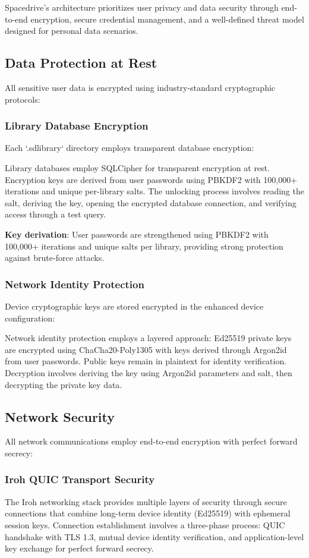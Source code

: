 \documentclass[sigconf]{acmart}
\begin{document}
Spacedrive's architecture prioritizes user privacy and data security through end-to-end encryption, secure credential management, and a well-defined threat model designed for personal data scenarios.

\subsection{Data Protection at Rest}
All sensitive user data is encrypted using industry-standard cryptographic protocols:

\subsubsection{Library Database Encryption}
Each `.sdlibrary` directory employs transparent database encryption:

Library databases employ SQLCipher for transparent encryption at rest. Encryption keys are derived from user passwords using PBKDF2 with 100,000+ iterations and unique per-library salts. The unlocking process involves reading the salt, deriving the key, opening the encrypted database connection, and verifying access through a test query.

\textbf{Key derivation}: User passwords are strengthened using PBKDF2 with 100,000+ iterations and unique salts per library, providing strong protection against brute-force attacks.

\subsubsection{Network Identity Protection}
Device cryptographic keys are stored encrypted in the enhanced device configuration:

Network identity protection employs a layered approach: Ed25519 private keys are encrypted using ChaCha20-Poly1305 with keys derived through Argon2id from user passwords. Public keys remain in plaintext for identity verification. Decryption involves deriving the key using Argon2id parameters and salt, then decrypting the private key data.

\subsection{Network Security}
All network communications employ end-to-end encryption with perfect forward secrecy:

\subsubsection{Iroh QUIC Transport Security}
The Iroh networking stack provides multiple layers of security through secure connections that combine long-term device identity (Ed25519) with ephemeral session keys. Connection establishment involves a three-phase process: QUIC handshake with TLS 1.3, mutual device identity verification, and application-level key exchange for perfect forward secrecy.
\end{document}
